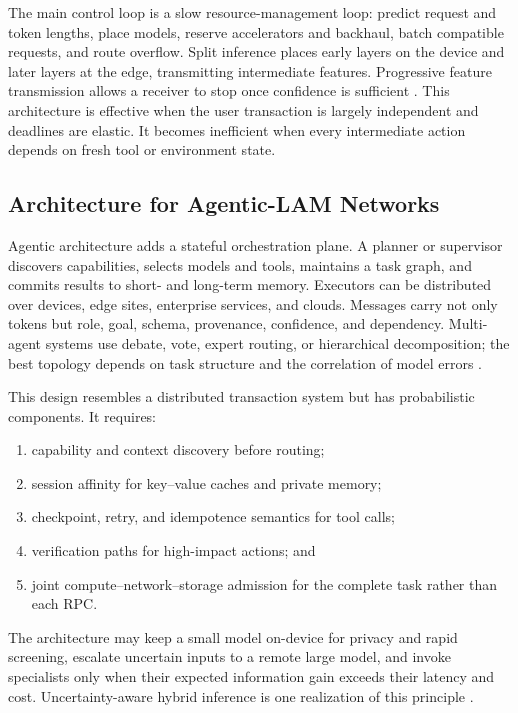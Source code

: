 \documentclass[letterpaper,journal]{IEEEtran}
\begin{document}
The main control loop is a slow resource-management loop: predict request and
token lengths, place models, reserve accelerators and backhaul, batch
compatible requests, and route overflow. Split inference places early layers
on the device and later layers at the edge, transmitting intermediate
features. Progressive feature transmission allows a receiver to stop once
confidence is sufficient \cite{progressive}. This architecture is effective
when the user transaction is largely independent and deadlines are elastic.
It becomes inefficient when every intermediate action depends on fresh tool
or environment state.

\subsection{Architecture for Agentic-LAM Networks}
Agentic architecture adds a stateful orchestration plane. A planner or
supervisor discovers capabilities, selects models and tools, maintains a task
graph, and commits results to short- and long-term memory. Executors can be
distributed over devices, edge sites, enterprise services, and clouds.
Messages carry not only tokens but role, goal, schema, provenance, confidence,
and dependency. Multi-agent systems use debate, vote, expert routing, or
hierarchical decomposition; the best topology depends on task structure and
the correlation of model errors \cite{agentsmobile}.

This design resembles a distributed transaction system but has probabilistic
components. It requires:
\begin{enumerate}
\item capability and context discovery before routing;
\item session affinity for key--value caches and private memory;
\item checkpoint, retry, and idempotence semantics for tool calls;
\item verification paths for high-impact actions; and
\item joint compute--network--storage admission for the complete task rather
than each RPC.
\end{enumerate}
The architecture may keep a small model on-device for privacy and rapid
screening, escalate uncertain inputs to a remote large model, and invoke
specialists only when their expected information gain exceeds their latency
and cost. Uncertainty-aware hybrid inference is one realization of this
principle \cite{hybrid}.
\end{document}
